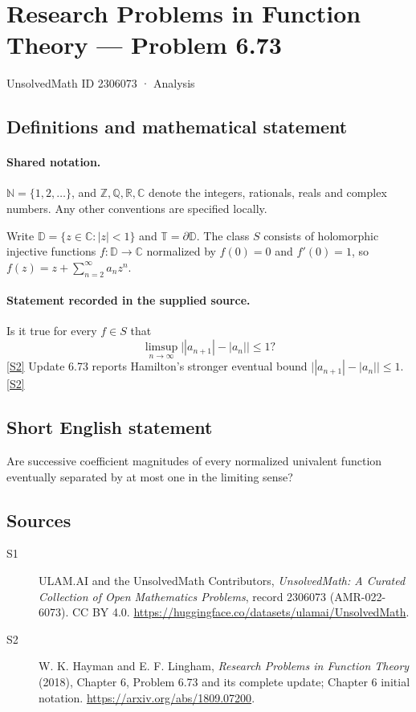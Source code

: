 \documentclass[11pt]{article}
\newcommand{\sref}[2]{\hyperlink{source:#1:#2}{[S#2]}}
\begin{document}
\setcounter{section}{2306072}
\section{Research Problems in Function Theory — Problem 6.73}\label{2306073}
{\small\sffamily UnsolvedMath ID 2306073 · Analysis}
\subsection{Definitions and mathematical statement}

\paragraph{Shared notation.}$\mathbb N=\{1,2,\ldots\}$, and $\mathbb Z,\mathbb Q,\mathbb R,\mathbb C$ denote the integers, rationals, reals and complex numbers. Any other conventions are specified locally.


Write $\mathbb D=\{z\in\mathbb C:|z|<1\}$ and $\mathbb T=\partial\mathbb D$. The class $S$ consists of holomorphic injective functions $f:\mathbb D\to\mathbb C$ normalized by $f(0)=0$ and $f'(0)=1$, so $f(z)=z+\sum_{n=2}^{\infty}a_nz^n$.
\paragraph{Statement recorded in the supplied source.}
Is it true for every $f\in S$ that \[\limsup_{n\to\infty}\bigl||a_{n+1}|-|a_n|\bigr|\le1?\] \sref{2306073}{2}
Update 6.73 reports Hamilton's stronger eventual bound $\bigl||a_{n+1}|-|a_n|\bigr|\le1$. \sref{2306073}{2}
\subsection{Short English statement}
Are successive coefficient magnitudes of every normalized univalent function eventually separated by at most one in the limiting sense?
\subsection{Sources}
\begin{description}
\item[\hypertarget{source:2306073:1}{S1}] ULAM.AI and the UnsolvedMath Contributors, \emph{UnsolvedMath: A Curated Collection of Open Mathematics Problems}, record 2306073 (AMR-022-6073). CC BY 4.0. \url{https://huggingface.co/datasets/ulamai/UnsolvedMath}.
\item[\hypertarget{source:2306073:2}{S2}] W. K. Hayman and E. F. Lingham, \emph{Research Problems in Function Theory} (2018), Chapter 6, Problem 6.73 and its complete update; Chapter 6 initial notation. \url{https://arxiv.org/abs/1809.07200}.
\end{description}
\label{end:2306073}
\end{document}
